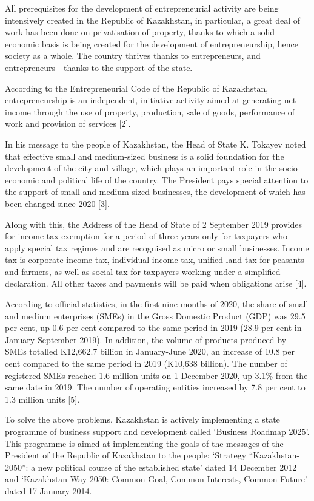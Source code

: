 \begin{multicols}{2}
All prerequisites for the development of entrepreneurial activity are
being intensively created in the Republic of Kazakhstan, in particular,
a great deal of work has been done on privatisation of property, thanks
to which a solid economic basis is being created for the development of
entrepreneurship, hence society as a whole. The country thrives thanks
to entrepreneurs, and entrepreneurs - thanks to the support of the
state.

According to the Entrepreneurial Code of the Republic of Kazakhstan,
entrepreneurship is an independent, initiative activity aimed at
generating net income through the use of property, production, sale of
goods, performance of work and provision of services {[}2{]}.

In his message to the people of Kazakhstan, the Head of State K. Tokayev
noted that effective small and medium-sized business is a solid
foundation for the development of the city and village, which plays an
important role in the socio-economic and political life of the country.
The President pays special attention to the support of small and
medium-sized businesses, the development of which has been changed since
2020 {[}3{]}.

Along with this, the Address of the Head of State of 2 September 2019
provides for income tax exemption for a period of three years only for
taxpayers who apply special tax regimes and are recognised as micro or
small businesses. Income tax is corporate income tax, individual income
tax, unified land tax for peasants and farmers, as well as social tax
for taxpayers working under a simplified declaration. All other taxes
and payments will be paid when obligations arise {[}4{]}.

According to official statistics, in the first nine months of 2020, the
share of small and medium enterprises (SMEs) in the Gross Domestic
Product (GDP) was 29.5 per cent, up 0.6 per cent compared to the same
period in 2019 (28.9 per cent in January-September 2019). In addition,
the volume of products produced by SMEs totalled K12,662.7 billion in
January-June 2020, an increase of 10.8 per cent compared to the same
period in 2019 (K10,638 billion). The number of registered SMEs reached
1.6 million units on 1 December 2020, up 3.1\% from the same date in
2019. The number of operating entities increased by 7.8 per cent to 1.3
million units {[}5{]}.

To solve the above problems, Kazakhstan is actively implementing a state
programme of business support and development called `Business Roadmap
2025'. This programme is aimed at implementing the goals of the messages
of the President of the Republic of Kazakhstan to the people: `Strategy
``Kazakhstan-2050'': a new political course of the established state'
dated 14 December 2012 and `Kazakhstan Way-2050: Common Goal, Common
Interests, Common Future' dated 17 January 2014.


\end{multicols}
